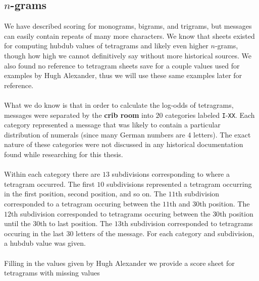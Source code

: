 \subsection{$n$-grams}
We have described scoring for monograms, bigrams, and trigrams, but
messages can easily contain repeats of many more characters. We
know that sheets existed for computing hubdub values of tetragrams
and likely even higher $n$-grams, though how high we cannot
definitively say without more historical sources. We also found no
reference to tetragram sheets save for a couple values used for
examples by Hugh Alexander, thus we will use these same examples
later for reference.
\\\\What we do know is that in order to calculate the log-odds of
tetragrams, messages were separated by the {\bf{crib room}} into
$20$ categories labeled \texttt{I}-\texttt{XX}. Each category
represented a message that was likely to contain a particular
distribution of numerals (since many German numbers are $4$
letters). The exact nature of these categories were not discussed
in any historical documentation found while researching for this thesis.
\\\\Within each category there are $13$ subdivisions corresponding
to where a tetragram occurred. The first $10$ subdivisions
represented a tetragram occurring in the first position, second
position, and so on. The $11$th subdivision corresponded to a
tetragram occuring between the $11$th and $30$th position. The
$12$th subdivision corresponded to tetragrams occuring between the
$30$th position until the $30$th to last position. The $13$th
subdivision corresponded to tetragrams occuring in the last $30$
letters of the message. For each category and subdivision, a hubdub
value was given.
\\\\Filling in the values given by Hugh Alexander we provide a
score sheet for tetragrams with missing values
